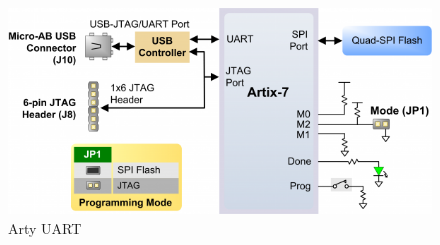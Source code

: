 \documentclass{eceday}
\begin{document}
\begin{frame}
\begin{columns}
\begin{column}{0.50\linewidth}
\begin{figure}[h!tbp]
        \centering
        \includegraphics[scale=0.20]{./Arty_UART-Config.png}
        \caption{Arty UART}
        \label{fig:Arty_UART}
      \end{figure}
    \end{column}
  \end{columns}
\end{frame}
\end{document}
